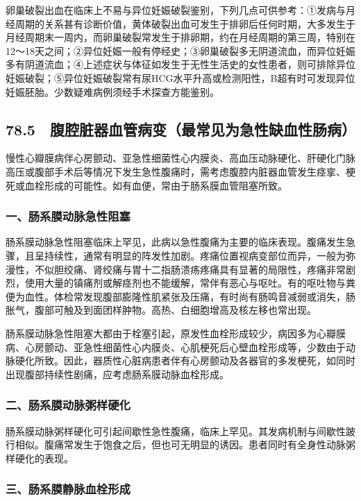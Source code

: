 卵巢破裂出血在临床上不易与异位妊娠破裂鉴别，下列几点可供参考：①发病与月经周期的关系甚有诊断价值，黄体破裂出血可发生于排卵后任何时期，大多发生于月经周期末一周内，而卵巢破裂常发生于排卵期，约在月经周期的第三周，特别在12～18天之间；②异位妊娠一般有停经史；③卵巢破裂多无阴道流血，而异位妊娠多有阴道流血；④上述症状与体征如发生于无性生活史的女性患者，则可排除异位妊娠破裂；⑤异位妊娠破裂常有尿HCG水平升高或检测阳性，B超有时可发现异位妊娠胚胎。少数疑难病例须经手术探查方能鉴别。

\protect\hypertarget{text00198.html}{}{}

\subsection{78.5　腹腔脏器血管病变（最常见为急性缺血性肠病）}

慢性心瓣膜病伴心房颤动、亚急性细菌性心内膜炎、高血压动脉硬化、肝硬化门脉高压或腹部手术后等情况下发生急性腹痛时，需考虑腹腔内脏器血管发生痉挛、梗死或血栓形成的可能性。如有血便，常由于肠系膜血管阻塞所致。

\subsubsection{一、肠系膜动脉急性阻塞}

肠系膜动脉急性阻塞临床上罕见，此病以急性腹痛为主要的临床表现。腹痛发生急骤，且呈持续性，通常有明显的阵发性加剧。疼痛位置视病变部位而异，一般为弥漫性，不似胆绞痛、肾绞痛与胃十二指肠溃疡疼痛具有显著的局限性，疼痛非常剧烈，使用大量的镇痛剂或解痉剂也不能缓解，常伴有恶心与呕吐。有的呕吐物与粪便为血性。体检常发现腹部膨隆性肌紧张及压痛，有时尚有肠鸣音减弱或消失，肠胀气，腹部可触及到面团样肿物。高热、白细胞增高及核左移也常出现。

肠系膜动脉急性阻塞大都由于栓塞引起，原发性血栓形成较少，病因多为心瓣膜病、心房颤动、亚急性细菌性心内膜炎、心肌梗死后心壁血栓形成等，少数由于动脉硬化所致。因此，器质性心脏病患者伴有心房颤动及各器官的多发梗死，如同时出现腹部持续性剧痛，应考虑肠系膜动脉血栓形成。

\subsubsection{二、肠系膜动脉粥样硬化}

肠系膜动脉粥样硬化可引起间歇性急性腹痛，临床上罕见。其发病机制与间歇性跛行相似。腹痛常发生于饱食之后，但也可无明显的诱因。患者同时有全身性动脉粥样硬化的表现。

\subsubsection{三、肠系膜静脉血栓形成}

